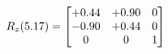 \documentclass[preview]{standalone}
\begin{document}
\begin{align*}
\special{dvisvgm:raw <g id='unique000'>}R_{z}(5.17) = \begin{bmatrix}+0.44 & +0.90 & 0 \\-0.90 & +0.44 & 0 \\0 & 0 & 1\end{bmatrix}\special{dvisvgm:raw </g>}
\end{align*}
\end{document}
